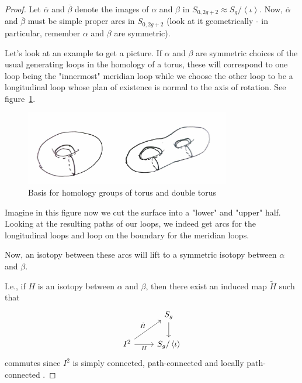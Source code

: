\documentclass[reqno]{amsart}
\theoremstyle{definition}
\theoremstyle{remark}
\begin{document}
   \begin{proof}
       Let $\overline{\alpha}$ and $\overline{\beta}$ 
       denote the images of $\alpha$ and $\beta$ 
       in $S_{0,2g+2}\approx S_g / \left<\iota \right>$.
       Now,
       $ \overline{\alpha}$ and $ \overline{\beta}$
       must be simple proper arcs in $S_{0,2g+2}$ (look
       at it geometrically - in particular, remember $\alpha$ and
       $\beta$ are symmetric).

       Let's look at an example to get a picture. If
       $\alpha$ and $\beta$ are symmetric choices of the
       usual generating loops in the homology of a torus, these
       will correspond to one loop being the
       "innermost" meridian loop while we choose the
       other loop to be a longitudinal loop
       whose plan of existence is
       normal to the axis of rotation. See
       figure~\ref{fig:homology-basis-of-torus-and-double-torus-png}.

       \begin{figure}[htpb]
           \centering
           \includegraphics[width=0.8\textwidth]{homology-basis-of-torus-and-double-torus.jpg}
           \caption{Basis for homology groups of torus and
           double torus}
           \label{fig:homology-basis-of-torus-and-double-torus-png}
       \end{figure}
       Imagine in this figure now we cut the surface into a "lower"
       and "upper" half. Looking at the resulting paths of
       our loops, we indeed get arcs for the longitudinal loops
       and loop on the boundary for the meridian loops.




       
       Now, an isotopy between
       these arcs will lift to a symmetric isotopy
       between $\alpha$ and $\beta$.


       I.e., if
       $H$ is an isotopy between $\alpha$ and $\beta$, then
       there exist an induced map $\tilde{H}$ such that
       \begin{equation*}
       \begin{tikzcd}
           & S_g \ar[d] \\
           I^2 \ar[ru, "\tilde{H}"] \ar[r, "H"'] &
           S_g / \left<\iota \right>
       \end{tikzcd}
       \end{equation*}
       commutes since $I^2$ is simply connected,
       path-connected and locally path-connected
       \cite[Cor~4.2]{Bredon}.
       

\end{proof}
\end{document}
